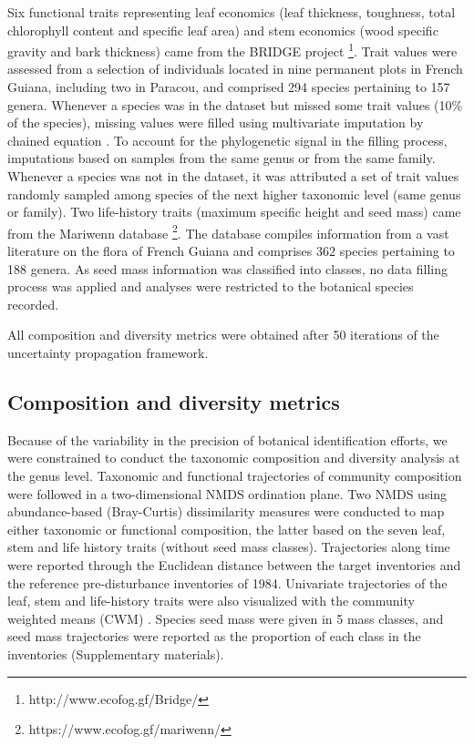 \documentclass[fleqn,10pt]{ArtEcoFoG} %
\begin{document}
Six functional traits representing leaf economics (leaf thickness,
toughness, total chlorophyll content and specific leaf area) and stem
economics (wood specific gravity and bark thickness) came from the
BRIDGE project \footnote{http://www.ecofog.gf/Bridge/}. Trait values
were assessed from a selection of individuals located in nine permanent
plots in French Guiana, including two in Paracou, and comprised 294
species pertaining to 157 genera. Whenever a species was in the dataset
but missed some trait values (10\% of the species), missing values were
filled using multivariate imputation by chained equation
\citep{Mice2011}. To account for the phylogenetic signal in the filling
process, imputations based on samples from the same genus or from the
same family. Whenever a species was not in the dataset, it was
attributed a set of trait values randomly sampled among species of the
next higher taxonomic level (same genus or family). Two life-history
traits (maximum specific height and seed mass) came from the Mariwenn
database \footnote{https://www.ecofog.gf/mariwenn/}. The database
compiles information from a vast literature on the flora of French
Guiana \citep{Ollivier2007} and comprises 362 species pertaining to 188
genera. As seed mass information was classified into classes, no data
filling process was applied and analyses were restricted to the
botanical species recorded.

All composition and diversity metrics were obtained after 50 iterations
of the uncertainty propagation framework.

\subsection{Composition and diversity
metrics}\label{composition-and-diversity-metrics}

Because of the variability in the precision of botanical identification
efforts, we were constrained to conduct the taxonomic composition and
diversity analysis at the genus level. Taxonomic and functional
trajectories of community composition were followed in a two-dimensional
NMDS ordination plane. Two NMDS using abundance-based (Bray-Curtis)
dissimilarity measures were conducted to map either taxonomic or
functional composition, the latter based on the seven leaf, stem and
life history traits (without seed mass classes). Trajectories along time
were reported through the Euclidean distance between the target
inventories and the reference pre-disturbance inventories of 1984.
Univariate trajectories of the leaf, stem and life-history traits were
also visualized with the community weighted means (CWM)
\citep{Diaz2007}. Species seed mass were given in 5 mass classes, and
seed mass trajectories were reported as the proportion of each class in
the inventories (Supplementary materials).
\end{document}
